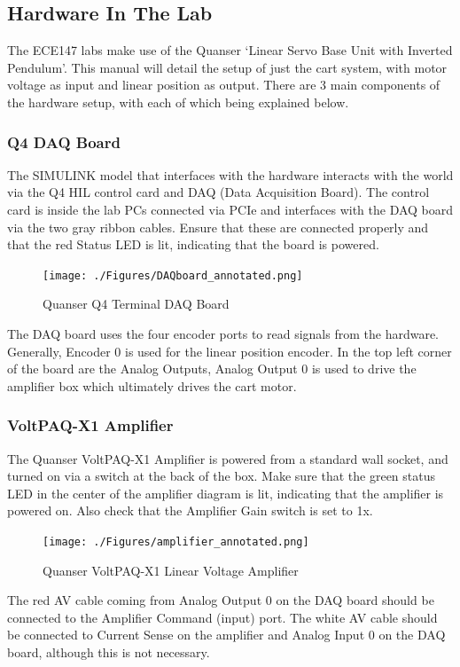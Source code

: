 \documentclass[11pt,letterpaper]{article}
\begin{document}
\subsection{Hardware In The Lab}
The ECE147 labs make use of the Quanser `Linear Servo Base Unit with Inverted Pendulum'. This manual will detail the setup of just the cart system, with motor voltage as input and linear position as output. There are 3 main components of the hardware setup, with each of which being explained below.

\subsubsection{Q4 DAQ Board}
The SIMULINK model that interfaces with the hardware interacts with the world via the Q4 HIL control card and DAQ (Data Acquisition Board). The control card is inside the lab PCs connected via PCIe and interfaces with the DAQ board via the two gray ribbon cables. Ensure that these are connected properly and that the red Status LED is lit, indicating that the board is powered.
\begin{figure}[H]
  \centering
  \texttt{[image: ./Figures/DAQboard\_annotated.png]}
  \caption{Quanser Q4 Terminal DAQ Board}
\end{figure}
The DAQ board uses the four encoder ports to read signals from the hardware. Generally, Encoder 0 is used for the linear position encoder. In the top left corner of the board are the Analog Outputs, Analog Output 0 is used to drive the amplifier box which ultimately drives the cart motor.



\subsubsection{VoltPAQ-X1 Amplifier}
The Quanser VoltPAQ-X1 Amplifier is powered from a standard wall socket, and turned on via a switch at the back of the box. Make sure that the green status LED in the center of the amplifier diagram is lit, indicating that the amplifier is powered on. Also check that the Amplifier Gain switch is set to 1x.


\begin{figure}[H]
  \centering
  \texttt{[image: ./Figures/amplifier\_annotated.png]}
  \caption{Quanser VoltPAQ-X1 Linear Voltage Amplifier}
\end{figure}

The red AV cable coming from Analog Output 0 on the DAQ board should be connected to the Amplifier Command (input) port. The white AV cable should be connected to Current Sense on the amplifier and Analog Input 0 on the DAQ board, although this is not necessary. \\
\end{document}
